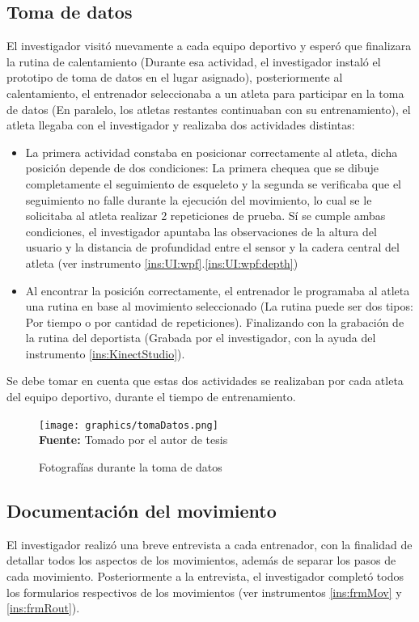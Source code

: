 \subsection{Toma de datos}
El investigador visit\'o nuevamente a cada equipo deportivo y esper\'o que finalizara la rutina de calentamiento (Durante esa actividad, el investigador instal\'o el prototipo de toma de datos en el lugar asignado), posteriormente al calentamiento, el entrenador seleccionaba a un atleta para participar en la toma de datos (En paralelo, los atletas restantes continuaban con su entrenamiento), el atleta llegaba con el investigador y realizaba dos actividades distintas:
\begin{itemize}
\item La primera actividad constaba en posicionar correctamente al atleta, dicha posici\'on depende de dos condiciones: La primera chequea que se dibuje completamente el seguimiento de esqueleto y la segunda se verificaba que el seguimiento no falle durante la ejecuci\'on del movimiento, lo cual se le solicitaba al atleta realizar 2 repeticiones de prueba. S\'i se cumple ambas condiciones, el investigador apuntaba las observaciones de la altura del usuario y la distancia de profundidad entre el sensor y la cadera central del atleta (ver instrumento \ref{ins:UI:wpf}.\ref{ins:UI:wpf:depth})
\item Al encontrar la posici\'on correctamente, el entrenador le programaba al atleta una rutina en base al movimiento seleccionado (La rutina puede ser dos tipos: Por tiempo o por cantidad de repeticiones). Finalizando con la grabaci\'on de la rutina del deportista (Grabada por el investigador, con la ayuda del instrumento \ref{ins:KinectStudio}).
\end{itemize}
Se debe tomar en cuenta que estas dos actividades se realizaban por cada atleta del equipo deportivo, durante el tiempo de entrenamiento.
 \begin{figure}[H]
	\caption{Fotograf\'ias durante la toma de datos}
	\label{fig:getDataStep}
	\centering
	\texttt{[image: graphics/tomaDatos.png]} \\
	\textbf{Fuente:} Tomado por el autor de tesis
\end{figure} 
\subsection{Documentaci\'on del movimiento}
El investigador realiz\'o una breve entrevista a cada entrenador, con la finalidad de detallar todos los aspectos de los movimientos, adem\'as de separar los pasos de cada movimiento. Posteriormente a la entrevista, el investigador complet\'o todos los formularios respectivos de los movimientos (ver instrumentos \ref{ins:frmMov} y \ref{ins:frmRout}).
